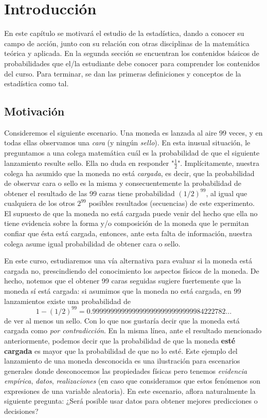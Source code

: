 \chapter{Introducción}

En este capítulo se motivará el estudio de la estadística, dando a conocer su campo de acción, junto con su relación con otras disciplinas de la matemática teórica y aplicada. En la segunda sección se encuentran los contenidos básicos de probabilidades que el/la estudiante debe conocer para comprender los contenidos del curso. Para terminar, se dan las primeras definiciones y conceptos de la estadística como tal. 

\section{Motivación}

Consideremos el siguiente escenario. Una moneda es lanzada al aire $99$ veces, y en todas ellas observamos una \emph{cara} (y ningún  \emph{sello}). En esta inusual situación, le preguntamos a una colega matemática cuál es la probabilidad de que el siguiente lanzamiento resulte sello. Ella no duda en responder "$\frac{1}{2}$".  Implícitamente, nuestra colega ha asumido que la moneda no está \emph{cargada}, es decir, que la probabilidad de observar cara o sello es la misma y consecuentemente la probabilidad de obtener el resultado de las 99 caras tiene probabilidad $(1/2)
^{99}$, al igual que cualquiera de los otros $2^{99}$ posibles resultados (secuencias) de este experimento. El supuesto de que la moneda no está cargada puede venir del hecho que ella no tiene evidencia sobre la forma y/o composición de la moneda que le permitan confiar que ésta está cargada, entonces, ante esta falta de información, nuestra colega asume igual probabilidad de obtener cara o sello.

En este curso, estudiaremos una vía alternativa para evaluar si la moneda está cargada no, prescindiendo del conocimiento los aspectos físicos de la moneda. De hecho, notemos que el obtener 99 caras seguidas sugiere fuertemente que la moneda sí está  cargada: si asumimos que la moneda no está cargada, en 99 lanzamientos existe una probabilidad de 
\[1-(1/2)
^{99} = 0.9999999999999999999999999999984222782\ldots\]
de ver al menos un sello. Con lo que nos gustaría decir que la moneda está cargada como \emph{por contradicción}. En la misma línea, ante el resultado mencionado anteriormente, podemos decir que la probabilidad de que la moneda \textbf{esté cargada} es mayor que la probabilidad de que no lo esté. Este ejemplo del lanzamiento de una moneda desconocida es una ilustración para escenarios generales donde desconocemos las propiedades físicas pero tenemos \emph{evidencia empírica}, \emph{datos}, \emph{realizaciones} (en caso que consideramos que estos fenómenos son expresiones de una variable aleatoria). En este escenario, aflora naturalmente la siguiente pregunta: ¿Será posible usar datos para obtener mejores predicciones o decisiones?

